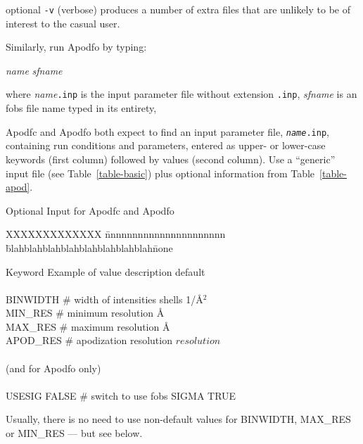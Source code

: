 \documentclass{report}
\begin{document}
{\qq optional {\tt -v} (verbose) produces a number of extra files that are
unlikely to be of interest to the casual user.

Similarly, run Apodfo by typing:

 {\it name} {\it sfname}

where 
{\it name}{\tt .inp} is the input parameter file without extension {\tt .inp},
{\it sfname} is an fobs file name typed in its entirety,

Apodfc and Apodfo both expect to find an input parameter file, 
{\tt {\it name}.inp}, 
containing run conditions and parameters, entered as upper- or lower-case 
keywords (first column) followed by values (second column).   Use a ``generic''
input file (see Table~\ref{table-basic}) plus optional information from 
Table~\ref{table-apod}.

\begin{table} [htb]
\caption {\large Optional Input for Apodfc and Apodfo}
\label{table-apod}

\begin{tabbing}
XXXXXXXXXXXXX \= nnnnnnnnnnnnnnnnnnnnnn \= 
blahblahblahblahblahblahblahblah\= none \kill

Keyword \> Example of value \> description \> default \\
\\
BINWIDTH \>  \#  width of intensities shells  1/\AA$^2$ \\
MIN\_RES  \>  \#  minimum resolution  \AA \\
MAX\_RES  \> \#  maximum resolution  \AA \\
APOD\_RES  \> \#  apodization resolution \> $resolution$ \\
\\
\> (and for Apodfo only) \\
\\
USESIG \> FALSE \> \# switch to use fobs SIGMA \> TRUE \\

\end{tabbing} 
\end{table}

Usually, there is no need to use non-default values for 
BINWIDTH, MAX\_RES
 or MIN\_RES --- but see below.

\vspace {0.1in}

}
\end{document}
